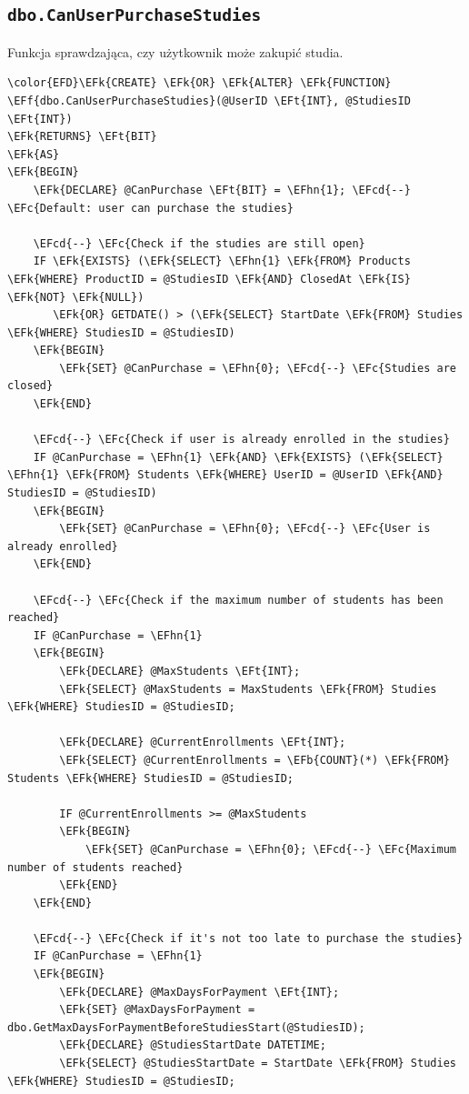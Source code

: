 \documentclass[11pt]{article}
\newcommand{\EFc}[1]{\textcolor{EFc}{\textit{#1}}} %
\newcommand{\EFcd}[1]{\textcolor{EFcd}{\textit{#1}}} %
\newcommand{\EFk}[1]{\textcolor{EFk}{\textbf{#1}}} %
\newcommand{\EFb}[1]{\textcolor{EFb}{\textbf{#1}}} %
\newcommand{\EFf}[1]{\textcolor{EFf}{#1}} %
\newcommand{\EFt}[1]{\textcolor{EFt}{\textbf{#1}}} %
\newcommand{\EFhn}[1]{\textcolor{EFhn}{#1}} %
\begin{document}
\subsection{\texttt{dbo.CanUserPurchaseStudies}}
\label{sec:org21c2502}
Funkcja sprawdzająca, czy użytkownik może zakupić studia.
\begin{Code}
\begin{Verbatim}
\color{EFD}\EFk{CREATE} \EFk{OR} \EFk{ALTER} \EFk{FUNCTION} \EFf{dbo.CanUserPurchaseStudies}(@UserID \EFt{INT}, @StudiesID \EFt{INT})
\EFk{RETURNS} \EFt{BIT}
\EFk{AS}
\EFk{BEGIN}
    \EFk{DECLARE} @CanPurchase \EFt{BIT} = \EFhn{1}; \EFcd{--} \EFc{Default: user can purchase the studies}

    \EFcd{--} \EFc{Check if the studies are still open}
    IF \EFk{EXISTS} (\EFk{SELECT} \EFhn{1} \EFk{FROM} Products \EFk{WHERE} ProductID = @StudiesID \EFk{AND} ClosedAt \EFk{IS} \EFk{NOT} \EFk{NULL})
       \EFk{OR} GETDATE() > (\EFk{SELECT} StartDate \EFk{FROM} Studies \EFk{WHERE} StudiesID = @StudiesID)
    \EFk{BEGIN}
        \EFk{SET} @CanPurchase = \EFhn{0}; \EFcd{--} \EFc{Studies are closed}
    \EFk{END}

    \EFcd{--} \EFc{Check if user is already enrolled in the studies}
    IF @CanPurchase = \EFhn{1} \EFk{AND} \EFk{EXISTS} (\EFk{SELECT} \EFhn{1} \EFk{FROM} Students \EFk{WHERE} UserID = @UserID \EFk{AND} StudiesID = @StudiesID)
    \EFk{BEGIN}
        \EFk{SET} @CanPurchase = \EFhn{0}; \EFcd{--} \EFc{User is already enrolled}
    \EFk{END}

    \EFcd{--} \EFc{Check if the maximum number of students has been reached}
    IF @CanPurchase = \EFhn{1}
    \EFk{BEGIN}
        \EFk{DECLARE} @MaxStudents \EFt{INT};
        \EFk{SELECT} @MaxStudents = MaxStudents \EFk{FROM} Studies \EFk{WHERE} StudiesID = @StudiesID;

        \EFk{DECLARE} @CurrentEnrollments \EFt{INT};
        \EFk{SELECT} @CurrentEnrollments = \EFb{COUNT}(*) \EFk{FROM} Students \EFk{WHERE} StudiesID = @StudiesID;

        IF @CurrentEnrollments >= @MaxStudents
        \EFk{BEGIN}
            \EFk{SET} @CanPurchase = \EFhn{0}; \EFcd{--} \EFc{Maximum number of students reached}
        \EFk{END}
    \EFk{END}

    \EFcd{--} \EFc{Check if it's not too late to purchase the studies}
    IF @CanPurchase = \EFhn{1}
    \EFk{BEGIN}
        \EFk{DECLARE} @MaxDaysForPayment \EFt{INT};
        \EFk{SET} @MaxDaysForPayment = dbo.GetMaxDaysForPaymentBeforeStudiesStart(@StudiesID);
        \EFk{DECLARE} @StudiesStartDate DATETIME;
        \EFk{SELECT} @StudiesStartDate = StartDate \EFk{FROM} Studies \EFk{WHERE} StudiesID = @StudiesID;


\end{Verbatim}
\end{Code}
\end{document}

